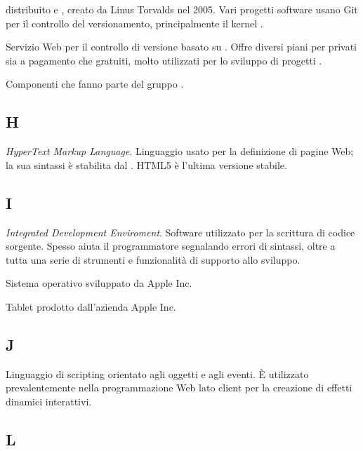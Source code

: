 		 distribuito e , creato da Linus Torvalds nel 2005.
		Vari progetti software usano Git per il controllo del versionamento, principalmente il kernel .
		
		Servizio Web per il controllo di versione basato su . Offre diversi piani per  privati sia a pagamento che gratuiti, molto utilizzati per lo sviluppo di progetti .
		
		Componenti che fanno parte del gruppo \zephyrus.
	\subsection{H}
	
	\textit{HyperText Markup Language}. Linguaggio usato per la definizione di pagine Web; la sua sintassi è stabilita dal .
	HTML5 è l'ultima versione stabile.
	
	\subsection{I}
		\textit{Integrated Development Enviroment}. Software utilizzato per la scrittura di codice sorgente. Spesso aiuta il programmatore segnalando errori di sintassi, oltre a tutta una serie di strumenti e funzionalità di supporto allo sviluppo.
	
		Sistema operativo sviluppato da Apple Inc.
	
		Tablet prodotto dall'azienda Apple Inc.
	\subsection{J}
	
	Linguaggio di scripting orientato agli oggetti e agli eventi. È utilizzato prevalentemente nella programmazione Web lato client per la creazione di effetti dinamici interattivi.
	
	\subsection{L}
	
